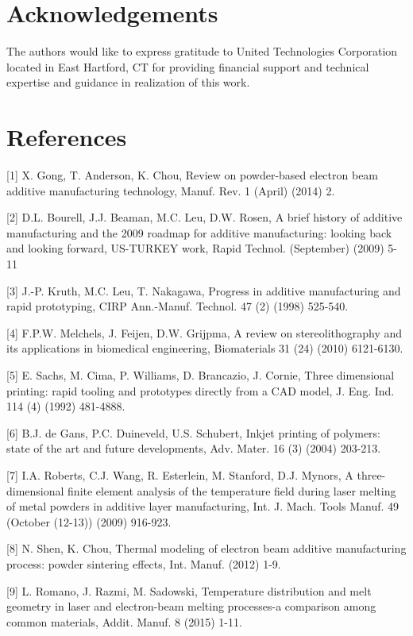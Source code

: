 \documentclass[10pt]{article}
\begin{document}
\section*{Acknowledgements}
The authors would like to express gratitude to United Technologies Corporation located in East Hartford, CT for providing financial support and technical expertise and guidance in realization of this work.

\section*{References}
[1] X. Gong, T. Anderson, K. Chou, Review on powder-based electron beam additive manufacturing technology, Manuf. Rev. 1 (April) (2014) 2.

[2] D.L. Bourell, J.J. Beaman, M.C. Leu, D.W. Rosen, A brief history of additive manufacturing and the 2009 roadmap for additive manufacturing: looking back and looking forward, US-TURKEY work, Rapid Technol. (September) (2009) 5-11

[3] J.-P. Kruth, M.C. Leu, T. Nakagawa, Progress in additive manufacturing and rapid prototyping, CIRP Ann.-Manuf. Technol. 47 (2) (1998) 525-540.

[4] F.P.W. Melchels, J. Feijen, D.W. Grijpma, A review on stereolithography and its applications in biomedical engineering, Biomaterials 31 (24) (2010) 6121-6130.

[5] E. Sachs, M. Cima, P. Williams, D. Brancazio, J. Cornie, Three dimensional printing: rapid tooling and prototypes directly from a CAD model, J. Eng. Ind. 114 (4) (1992) 481-4888.

[6] B.J. de Gans, P.C. Duineveld, U.S. Schubert, Inkjet printing of polymers: state of the art and future developments, Adv. Mater. 16 (3) (2004) 203-213.

[7] I.A. Roberts, C.J. Wang, R. Esterlein, M. Stanford, D.J. Mynors, A three-dimensional finite element analysis of the temperature field during laser melting of metal powders in additive layer manufacturing, Int. J. Mach. Tools Manuf. 49 (October (12-13)) (2009) 916-923.

[8] N. Shen, K. Chou, Thermal modeling of electron beam additive manufacturing process: powder sintering effects, Int. Manuf. (2012) 1-9.

[9] L. Romano, J. Razmi, M. Sadowski, Temperature distribution and melt geometry in laser and electron-beam melting processes-a comparison among common materials, Addit. Manuf. 8 (2015) 1-11.
\end{document}
